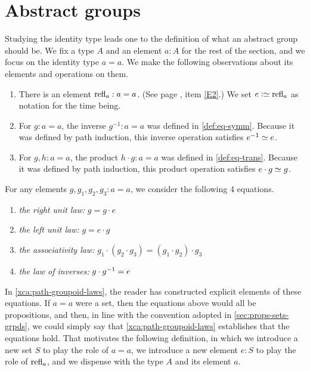 \section{Abstract groups}
\label{sec:identity-type-as-abstract}

Studying the identity type leads one to the definition of what an abstract group should be.  We fix a type $A$ and an element $a:A$ for the rest
of the section, and we focus on the identity type $a=a$.  We make the following observations about its elements and operations on them.

\begin{enumerate}
\item
  There is an element $\mathrm{refl}_{a} : a=a$.
  (See page \pageref{rules-for-equality}, item \ref{E2}.)
  We set $e \defeq \refl a$ as notation for the time being.
\item
  For $g : a=a$, the inverse $g^{-1} : a=a$ was defined in \cref{def:eq-symm}.
  Because it was defined by path induction, this inverse operation satisfies $e^{-1} \jdeq e$.
\item
  For $g, h : a=a$, the product $h \cdot g : a=a$ was defined in \cref{def:eq-trans}.
  Because it was defined by path induction, this product operation satisfies $e \cdot g \jdeq g$.
\end{enumerate}

For any elements $g,g_1,g_2,g_3:a=a$, we consider the following 4 equations.
\begin{enumerate}
\item
  \label{it:right-unit} \emph{the right unit law:} $g=g\cdot e$  
\item
  \label{it:left-unit} \emph{the left unit law:} $g=e\cdot g$ 
\item
  \label{it:associativity} \emph{the associativity law:} $g_1\cdot(g_2\cdot g_3)=(g_1\cdot g_2)\cdot g_3$ 
\item
  \label{it:inverse} \emph{the law of inverses:} $g\cdot g^{-1} = e$ 
\end{enumerate}

In \cref{xca:path-groupoid-laws}, the reader has constructed explicit elements of these equations.  If $a=a$ were a set, then the equations
above would all be propositions, and then, in line with the convention adopted in \cref{sec:props-sets-grpds}, we could simply say that
\cref{xca:path-groupoid-laws} establishes that the equations hold.  That motivates the following definition, in which we introduce a new set $S$
to play the role of $a=a$, we introduce a new element $e:S$ to play the role of $\mathrm{refl}_{a}$, and we dispense with the type $A$ and its element
$a$.

